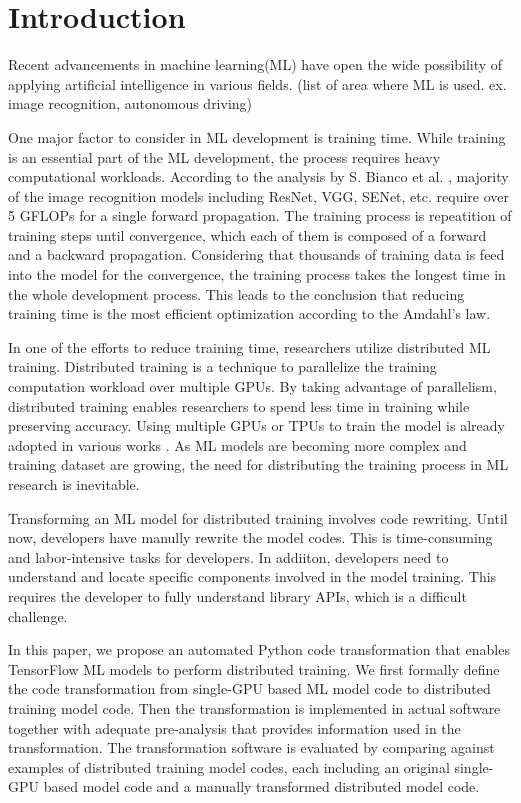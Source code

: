 \section{Introduction}\label{sec:intro}

Recent advancements in machine learning(ML) have open the wide possibility of
applying artificial intelligence in various fields.
(list of area where ML is used. ex. image recognition, autonomous driving)

One major factor to consider in ML development is training time.
While training is an essential part of the ML development,
the process requires heavy computational workloads.
According to the analysis by S. Bianco et al. \cite{bianco2018benchmark},
majority of the image recognition models including ResNet, VGG, SENet, etc.
require over 5 GFLOPs for a single forward propagation.
The training process is repeatition of training steps until convergence,
which each of them is composed of a forward and a backward propagation.
Considering that thousands of training data is feed into the model
for the convergence, the training process takes the longest time
in the whole development process. This leads to the conclusion that
reducing training time is the most efficient optimization according to
the Amdahl's law.

In one of the efforts to reduce training time, 
researchers utilize distributed ML training.
Distributed training is a technique to parallelize the training computation
workload over multiple GPUs.
By taking advantage of parallelism, distributed training enables researchers
to spend less time in training while preserving accuracy.
Using multiple GPUs or TPUs to train the model is already adopted
in various works \cite{brown2020gpt-3} \cite{silver2017alphazero}
\cite{zhang2019distrspeech} \cite{tian2020distrwebattack}.
As ML models are becoming more complex and training dataset are growing,
the need for distributing the training process in ML research is inevitable.

Transforming an ML model for distributed training involves code rewriting.
Until now, developers have manully rewrite the model codes.
This is time-consuming and labor-intensive tasks for developers.
In addiiton, developers need to understand and locate 
specific components involved in the model training.
This requires the developer to fully understand library APIs,
which is a difficult challenge.

In this paper, we propose an automated Python code transformation that enables
TensorFlow ML models to perform distributed training.
We first formally define the code transformation from
single-GPU based ML model code to distributed training model code.
Then the transformation is implemented in actual software together with
adequate pre-analysis that provides information used in the transformation.
The transformation software is evaluated by comparing against 
examples of distributed training model codes, 
each including an original single-GPU based model code 
and a manually transformed distributed model code.


